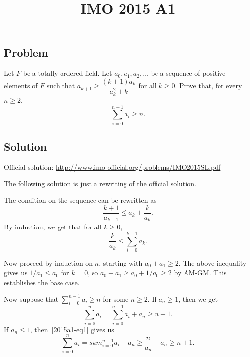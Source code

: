 \documentclass{article}
\title{IMO 2015 A1}
\author{}
\date{}
\begin{document}
\maketitle



\subsection*{Problem}

Let $F$ be a totally ordered field.
Let $a_0, a_1, a_2, \ldots$ be a sequence of positive elements of $F$ such that $a_{k + 1} \geq \dfrac{(k + 1) a_k}{a_k^2 + k}$ for all $k \geq 0$.
Prove that, for every $n \geq 2$,
\[ \sum_{i = 0}^{n - 1} a_i \geq n. \] 



\subsection*{Solution}

Official solution: \url{http://www.imo-official.org/problems/IMO2015SL.pdf}

The following solution is just a rewriting of the official solution.

The condition on the sequence can be rewritten as
\[ \frac{k + 1}{a_{k + 1}} \leq a_k + \frac{k}{a_k}. \]
By induction, we get that for all $k \geq 0$,
\[ \frac{k}{a_k} \leq \sum_{i = 0}^{k - 1} a_k. \tag{1}\label{2015a1-eq1} \]

Now proceed by induction on $n$, starting with $a_0 + a_1 \geq 2$.
The above inequality gives us $1/a_1 \leq a_0$ for $k = 0$, so $a_0 + a_1 \geq a_0 + 1/a_0 \geq 2$ by AM-GM.
This establishes the base case.

Now suppose that $\displaystyle \sum_{i = 0}^{n - 1} a_i \geq n$ for some $n \geq 2$.
If $a_n \geq 1$, then we get
\[ \sum_{i = 0}^n a_i = \sum_{i = 0}^{n - 1} a_i + a_n \geq n + 1. \]
If $a_n \leq 1$, then~\eqref{2015a1-eq1} gives us
\[ \sum_{i = 0}^n a_i = sum_{i = 0}^{n - 1} a_i + a_n \geq \frac{n}{a_n} + a_n \geq n + 1. \]
\end{document}

